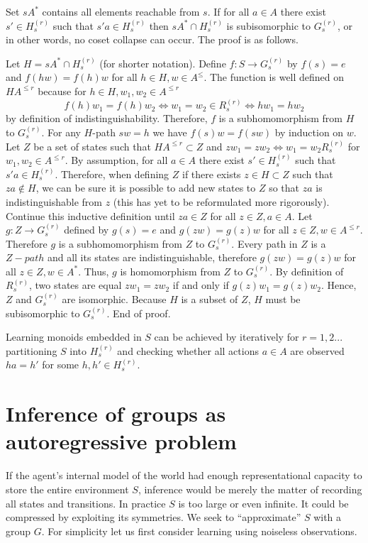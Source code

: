 \documentclass[oneside,english,logo]{amuthesis}
\begin{document}
Set $sA^*$ contains all elements reachable from $s$.
If for all $a\in A$  there exist $s'\in H_{s}^{(r)}$ such that $s'a\in H_{s}^{(r)}$ then $sA^*\cap H_{s}^{(r)}$ is subisomorphic to $G_{s}^{(r)}$, or in other words, no coset collapse can occur. The proof is as follows. 

Let $H=sA^*\cap H_{s}^{(r)}$ (for shorter notation).
Define $f:S\rightarrow G_{s}^{(r)}$ by $f(s)=e$ and $f(hw)=f(h)w$ for all $h\in H ,w\in A^{\le}$.
The function is well defined on $HA^{\le r}$ because for $h\in H, w_1,w_2\in A^{\le r}$
\[
f(h)w_1=f(h)w_2 \iff w_1=w_2\in R_{s}^{(r)} \iff hw_1=hw_2 
\]
by definition of indistinguishability. Therefore, $f$ is a subhomomorphism from $H$ to $G_{s}^{(r)}$. For any $H$-path $sw=h$ we have $f(s)w=f(sw)$ by induction on $w$. Let $Z$ be a set of states such that $HA^{\le r}\subset Z$ and $zw_1=zw_2\iff w_1=w_2 R_{s}^{(r)}$ for $w_1,w_2\in A^{\le r}$. By assumption, for all $a\in A$  there exist $s'\in H_{s}^{(r)}$ such that $s'a\in H_{s}^{(r)}$. Therefore, when defining $Z$ if there exists $z\in H\subset Z$ such that $za\notin H$, we can be sure it is possible to add new states to $Z$ so that $za$ is indistinguishable from $z$ (this has yet to be reformulated more rigorously). Continue this inductive definition until $za\in Z$ for all $z\in Z,a\in A$. Let $g:Z\rightarrow G_{s}^{(r)}$ defined by $g(s)=e$ and $g(zw)=g(z)w$ for all $z\in Z,w\in A^{\le r}$. Therefore $g$ is a subhomomorphism from $Z$ to $G_{s}^{(r)}$. Every path in $Z$ is a $Z-path$ and all its states are indistinguishable, therefore $g(zw)=g(z)w$ for all $z\in Z,w\in A^*$. Thus, $g$ is homomorphism from $Z$ to $G_{s}^{(r)}$. By definition of $R_{s}^{(r)}$, two states are equal $zw_1=zw_2$ if and only if $g(z)w_1=g(z)w_2$. Hence, $Z$ and $G_{s}^{(r)}$ are isomorphic. Because $H$ is a subset of $Z$, $H$ must be subisomorphic to $G_{s}^{(r)}$. End of proof. 

Learning monoids embedded in $S$ can be achieved by iteratively for $r=1,2...$ partitioning $S$ into $H_{s}^{(r)}$ and checking whether all actions $a\in A$ are observed $ha=h'$ for some $h,h'\in H_{s}^{(r)}$.


\section{Inference of groups as autoregressive problem}
If the agent's internal model of the world had enough representational capacity to store the entire environment $S$, inference would be merely the matter of recording all states and transitions. In practice $S$ is too large or even infinite. It could be compressed by exploiting its symmetries. We seek to ``approximate'' $S$ with a group $G$. For simplicity let us first consider learning using noiseless observations.
\end{document}
